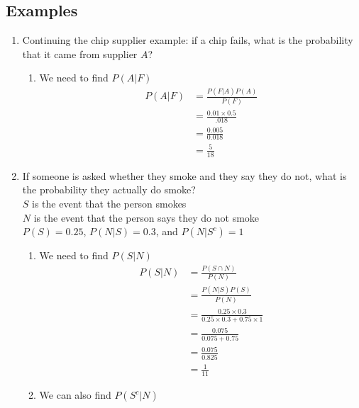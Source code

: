 \documentclass[12pt]{article}
\begin{document}
        \subsection{Examples}
            \begin{enumerate}
                \item Continuing the chip supplier example: if a chip fails, what is the probability that it came from supplier $A$?
                \begin{enumerate}
                    \item We need to find $P(A|F)$
                    \begin{align*}
                        P(A|F) &= \frac{P(F|A)P(A)}{P(F)}\\
                        &= \frac{0.01\times0.5}{.018}\\
                        &= \frac{0.005}{0.018}\\
                        &= \frac{5}{18}
                    \end{align*}
                \end{enumerate}
                \item If someone is asked whether they smoke and they say they do not, what is the probability they actually do smoke?
                \\$S$ is the event that the person smokes
                \\$N$ is the event that the person says they do not smoke
                \\$P (S) = 0.25$, $P (N|S) = 0.3$, and $P (N|S^c) = 1$
                \begin{enumerate}
                    \item We need to find $P (S|N)$
                    \begin{align*}
                        P(S|N) &= \frac{P(S \cap N)}{P(N)}\\
                        &= \frac{P(N|S)P(S)}{P(N)}\\
                        &= \frac{0.25\times0.3}{0.25\times0.3+0.75\times1}\\
                        &= \frac{0.075}{0.075+0.75}\\
                        &= \frac{0.075}{0.825}\\
                        &= \frac{1}{11}
                    \end{align*}
                    \item We can also find $P(S^c|N)$
                    \begin{align*}

\end{align*}
\end{enumerate}
\end{enumerate}
\end{document}
